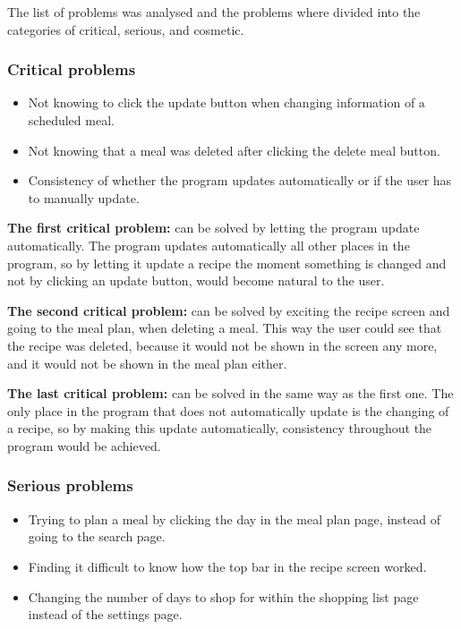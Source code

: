 The list of problems was analysed and the problems where divided into the categories of critical, serious, and cosmetic.

\subsubsection{Critical problems}

\begin{itemize}
    \item Not knowing to click the update button when changing information of a scheduled meal.
    \item Not knowing that a meal was deleted after clicking the delete meal button.
    \item Consistency of whether the program updates automatically or if the user has to manually update.
\end{itemize}    
\textbf{The first critical problem:} can be solved by letting the program update automatically. The program updates automatically all other places in the program, so by letting it update a recipe the moment something is changed and not by clicking an update button, would become natural to the user.

\textbf{The second critical problem:} can be solved by exciting the recipe screen and going to the meal plan, when deleting a meal. This way the user could see that the recipe was deleted, because it would not be shown in the screen any more, and it would not be shown in the meal plan either.

\textbf{The last critical problem:} can be solved in the same way as the first one. The only place in the program that does not automatically update is the changing of a recipe, so by making this update automatically, consistency throughout the program would be achieved.

\subsubsection{Serious problems}

\begin{itemize}
    \item Trying to plan a meal by clicking the day in the meal plan page, instead of going to the search page.
    \item Finding it difficult to know how the top bar in the recipe screen worked.
    \item Changing the number of days to shop for within the shopping list page instead of the settings page.
\end{itemize}

